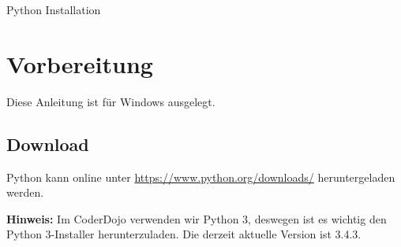 \documentclass[ngerman,oneside, a4letter]{article}
\begin{document}
{\huge Python Installation}

\section{Vorbereitung}
Diese Anleitung ist für Windows ausgelegt.

\subsection{Download}
Python kann online unter \url{https://www.python.org/downloads/} heruntergeladen werden.
\\

\begin{center}
\end{center}
\textbf{Hinweis:} Im CoderDojo verwenden wir Python 3, deswegen ist es wichtig den Python 3-Installer herunterzuladen. Die derzeit aktuelle Version ist 3.4.3.

\clearpage
\end{document}

